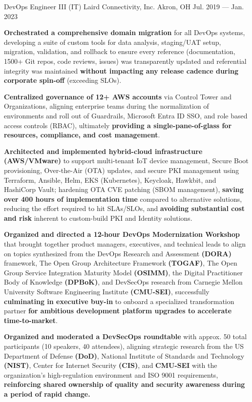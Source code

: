 \begin{cventries}
    \cventry
        { DevOps Engineer III (IT) }
        { Laird Connectivity, Inc. }
        { Akron, OH }
        { Jul. 2019 --- Jan. 2023 }
        {
            \begin{cvitems}
                \item{\textbf{Orchestrated a comprehensive domain migration} for all DevOps systems, developing a suite of custom tools for data analysis, staging/UAT setup, migration, validation, and rollback to ensure every reference (documentation, 1500+ Git repos, code reviews, issues) was transparently updated and referential integrity was maintained \textbf{without impacting any release cadence during corporate spin-off} (exceeding SLOs).}
                \item{\textbf{Centralized governance of 12+ AWS accounts} via Control Tower and Organizations, aligning enterprise teams during the normalization of environments and roll out of Guardrails, Microsoft Entra ID SSO, and role based access controls (RBAC), ultimately \textbf{providing a single-pane-of-glass for resources, compliance, and cost management}.}
                \item{\textbf{Architected and implemented hybrid-cloud infrastructure (AWS/VMware)} to support multi-tenant IoT device management, Secure Boot provisioning, Over-the-Air (OTA) updates, and secure PKI management using Terraform, Ansible, Helm, EKS (Kubernetes), Keycloak, Hawkbit, and HashiCorp Vault; hardening OTA CVE patching (SBOM management), \textbf{saving over 400 hours of implementation time} compared to alternative solutions, reducing the effort required to hit SLAs/SLOs, and \textbf{avoiding substantial cost and risk} inherent to custom-build PKI and Identity solutions.}
                \item{\textbf{Organized and directed a 12-hour DevOps Modernization Workshop} that brought together product managers, executives, and technical leads to align on topics synthesized from the DevOps Research and Assessment \textbf{(DORA)} framework, The Open Group Architecture Framework \textbf{(TOGAF)}, The Open Group Service Integration Maturity Model \textbf{(OSIMM)}, the Digital Practitioner Body of Knowledge \textbf{(DPBoK)}, and DevSecOps research from Carnegie Mellon University Software Engineering Institute \textbf{(CMU-SEI)}, successfully \textbf{culminating in executive buy-in} to onboard a specialized transformation partner \textbf{for ambitious development platform upgrades to accelerate time-to-market}.}
                \item{\textbf{Organized and moderated a DevSecOps roundtable} with approx. 50 total participants (10 speakers, 40 attendees), aligning strategic research from the US Department of Defense \textbf{(DoD)}, National Institute of Standards and Technology \textbf{(NIST)}, Center for Internet Security \textbf{(CIS)}, and \textbf{CMU-SEI} with the organization's high-regulation environment and ISO 9001 requirements, \textbf{reinforcing shared ownership of quality and security awareness during a period of rapid change.}}
            \end{cvitems}
        }
\end{cventries}
